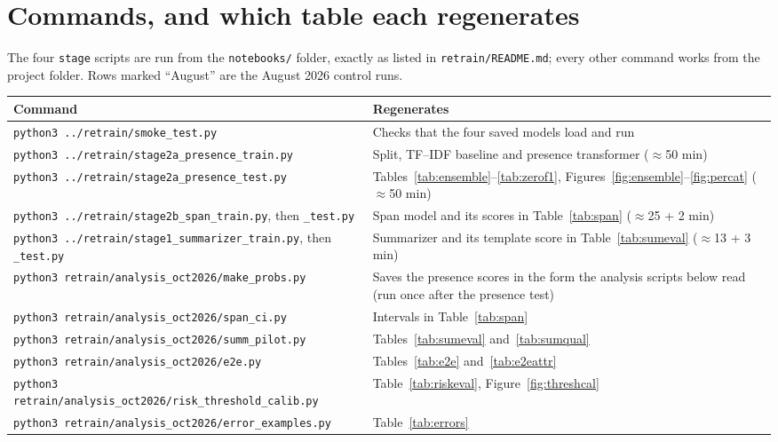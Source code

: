\section*{Commands, and which table each regenerates}
The four \texttt{stage} scripts are run from the \texttt{notebooks/} folder, exactly as listed in \texttt{retrain/README.md}; every other command works from the project folder. Rows marked ``August'' are the August 2026 control runs.

{\footnotesize
\begin{longtable}{>{\raggedright\arraybackslash}p{8.4cm} >{\raggedright\arraybackslash}p{5.6cm}}
\toprule
\textbf{Command} & \textbf{Regenerates}\\
\midrule
\endhead
\texttt{python3 ../retrain/smoke\_test.py} & Checks that the four saved models load and run\\
\texttt{python3 ../retrain/stage2a\_presence\_train.py} & Split, TF--IDF baseline and presence transformer ($\approx$50 min)\\
\texttt{python3 ../retrain/stage2a\_presence\_test.py} & Tables~\ref{tab:ensemble}--\ref{tab:zerof1}, Figures~\ref{fig:ensemble}--\ref{fig:percat} ($\approx$50 min)\\
\texttt{python3 ../retrain/stage2b\_span\_train.py}, then \texttt{\_test.py} & Span model and its scores in Table~\ref{tab:span} ($\approx$25 + 2 min)\\
\texttt{python3 ../retrain/stage1\_summarizer\_train.py}, then \texttt{\_test.py} & Summarizer and its template score in Table~\ref{tab:sumeval} ($\approx$13 + 3 min)\\
\texttt{python3 retrain/analysis\_oct2026/\allowbreak make\_probs.py} & Saves the presence scores in the form the analysis scripts below read (run once after the presence test)\\
\texttt{python3 retrain/analysis\_oct2026/\allowbreak span\_ci.py} & Intervals in Table~\ref{tab:span}\\
\texttt{python3 retrain/analysis\_oct2026/\allowbreak summ\_pilot.py} & Tables~\ref{tab:sumeval} and~\ref{tab:sumqual}\\
\texttt{python3 retrain/analysis\_oct2026/\allowbreak e2e.py} & Tables~\ref{tab:e2e} and~\ref{tab:e2eattr}\\
\texttt{python3 retrain/analysis\_oct2026/\allowbreak risk\_threshold\_calib.py} & Table~\ref{tab:riskeval}, Figure~\ref{fig:threshcal}\\
\texttt{python3 retrain/analysis\_oct2026/\allowbreak error\_examples.py} & Table~\ref{tab:errors}\\

\end{longtable}}
